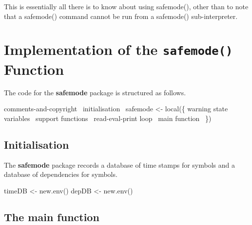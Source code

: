 \documentclass[a4paper]{article}%
\newcommand{\pkg}[1]{{\bf #1}}
\begin{document}
This is essentially all there is to know about using {\Tt{}safemode()\nwendquote},
other than to note that a {\Tt{}safemode()\nwendquote} command cannot be run from a
{\Tt{}safemode()\nwendquote} sub-interpreter.

\section{Implementation of the \texttt{safemode()} Function}

The code for the \textbf{safemode} package is structured as follows.

\endmoddef\let\nwnotused=\nwoutput{}\nwstartdeflinemarkup\nwenddeflinemarkup
\LA{}comments-and-copyright~{\nwtagstyle{}}\RA{}
\LA{}initialisation~{\nwtagstyle{}}\RA{}
safemode <- local(\{
    \LA{}warning state variables~{\nwtagstyle{}}\RA{}
    \LA{}support functions~{\nwtagstyle{}}\RA{}
    \LA{}read-eval-print loop~{\nwtagstyle{}}\RA{}
    \LA{}main function~{\nwtagstyle{}}\RA{}
\})
\nwnotused{safemode.R}\nwendcode{}\nwdocspar

\subsection{Initialisation}
\label{sec:init}

The \pkg{safemode} package records a database of time stamps
for symbols and a database of dependencies for symbols.

\nwenddocs{}\endmoddef\let\nwnotused=\nwoutput{}\nwstartdeflinemarkup{}\nwenddeflinemarkup
timeDB <- new.env()
depDB <- new.env()
\nwendcode{}\nwdocspar

\subsection{The main function}
\label{sec:the-main-function}
\end{document}

